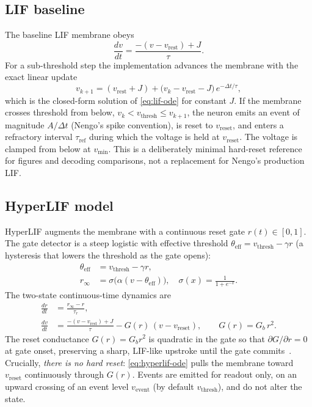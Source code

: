 \documentclass[11pt]{article}
\newcommand{\vth}{v_{\mathrm{thresh}}}
\newcommand{\vr}{v_{\mathrm{rest}}}
\newcommand{\vre}{v_{\mathrm{reset}}}
\newcommand{\vmin}{v_{\min}}
\newcommand{\teff}{\theta_{\mathrm{eff}}}
\newcommand{\rinf}{r_{\infty}}
\newcommand{\Gb}{G_{b}}
\begin{document}
\subsection{LIF baseline}\label{sec:lif}
The baseline LIF membrane obeys
\begin{equation}
  \frac{dv}{dt} = \frac{-(v-\vr) + J}{\tau}. \label{eq:lif-ode}
\end{equation}
For a sub-threshold step the implementation advances the membrane with the exact
linear update
\begin{equation}
  v_{k+1} = (\vr + J) + \big(v_k - \vr - J\big)\,e^{-\Delta t/\tau},
  \label{eq:lif-update}
\end{equation}
which is the closed-form solution of \cref{eq:lif-ode} for constant $J$. If the
membrane crosses threshold from below, $v_k<\vth\le v_{k+1}$, the neuron emits an
event of magnitude $A/\Delta t$ (Nengo's spike convention), is reset to $\vre$,
and enters a refractory interval $\tau_{\mathrm{ref}}$ during which the voltage
is held at $\vre$. The voltage is clamped from below at $\vmin$. This is a
deliberately minimal hard-reset reference for figures and decoding comparisons,
not a replacement for Nengo's production LIF.

\subsection{HyperLIF model}\label{sec:hyperlif}
HyperLIF augments the membrane with a continuous reset gate $r(t)\in[0,1]$. The
gate detector is a steep logistic with effective threshold
$\teff=\vth-\gamma r$ (a hysteresis that lowers the threshold as the gate opens):
\begin{align}
  \teff &= \vth - \gamma r, \label{eq:theta}\\
  \rinf &= \sigma\!\big(\alpha (v-\teff)\big), \quad
  \sigma(x) = \frac{1}{1+e^{-x}}. \label{eq:sigmoid}
\end{align}
The two-state continuous-time dynamics are
\begin{align}
  \frac{dr}{dt} &= \frac{\rinf - r}{\tau_r}, \label{eq:gate-ode}\\
  \frac{dv}{dt} &= \frac{-(v-\vr)+J}{\tau} - G(r)\,(v-\vre), \qquad
  G(r) = \Gb\, r^2. \label{eq:hyperlif-ode}
\end{align}
The reset conductance $G(r)=\Gb r^2$ is quadratic in the gate so that
$\partial G/\partial r = 0$ at gate onset, preserving a sharp, LIF-like upstroke
until the gate commits~\cite{hyperlif_theory}. Crucially, \emph{there is no hard
reset}: \cref{eq:hyperlif-ode} pulls the membrane toward $\vre$ continuously
through $G(r)$. Events are emitted for readout only, on an upward crossing of an
event level $v_{\mathrm{event}}$ (by default $\vth$), and do not alter the state.
\end{document}
